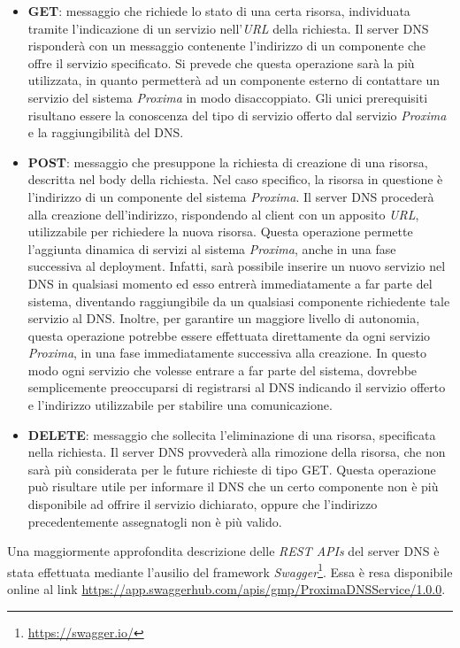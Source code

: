 \documentclass[a4paper,12pt]{report}
\begin{document}
\begin{itemize}
	\item \textbf{GET}: messaggio che richiede lo stato di una certa risorsa, individuata tramite l'indicazione di un servizio nell'\emph{URL} della richiesta. Il server DNS risponderà con un messaggio contenente l'indirizzo di un componente che offre il servizio specificato. \newline Si prevede che questa operazione sarà la più utilizzata, in quanto permetterà ad un componente esterno di contattare un servizio del sistema \emph{Proxima} in modo disaccoppiato. Gli unici prerequisiti risultano essere la conoscenza del tipo di servizio offerto dal servizio \emph{Proxima} e la raggiungibilità del DNS.
	\item \textbf{POST}: messaggio che presuppone la richiesta di creazione di una risorsa, descritta nel body della richiesta. Nel caso specifico, la risorsa in questione è l'indirizzo di un componente del sistema \emph{Proxima}. Il server DNS procederà alla creazione dell'indirizzo, rispondendo al client con un apposito \emph{URL}, utilizzabile per richiedere la nuova risorsa. \newline Questa operazione permette l'aggiunta dinamica di servizi al sistema \emph{Proxima}, anche in una fase successiva al deployment. Infatti, sarà possibile inserire un nuovo servizio nel DNS in qualsiasi momento ed esso entrerà immediatamente a far parte del sistema, diventando raggiungibile da un qualsiasi componente richiedente tale servizio al DNS. Inoltre, per garantire un maggiore livello di autonomia, questa operazione potrebbe essere effettuata direttamente da ogni servizio \emph{Proxima}, in una fase immediatamente successiva alla creazione. In questo modo ogni servizio che volesse entrare a far parte del sistema, dovrebbe semplicemente preoccuparsi di registrarsi al DNS indicando il servizio offerto e l'indirizzo utilizzabile per stabilire una comunicazione.
	\item \textbf{DELETE}: messaggio che sollecita l'eliminazione di una risorsa, specificata nella richiesta. Il server DNS provvederà alla rimozione della risorsa, che non sarà più considerata per le future richieste di tipo GET. \newline Questa operazione può risultare utile per informare il DNS che un certo componente non è più disponibile ad offrire il servizio dichiarato, oppure che l'indirizzo precedentemente assegnatogli non è più valido.
\end{itemize}
Una maggiormente approfondita descrizione delle \emph{REST APIs} del server DNS è stata effettuata mediante l'ausilio del framework \emph{Swagger}\footnote{\url{https://swagger.io/}}. Essa è resa disponibile online al link \url{https://app.swaggerhub.com/apis/gmp/ProximaDNSService/1.0.0}.
\end{document}
